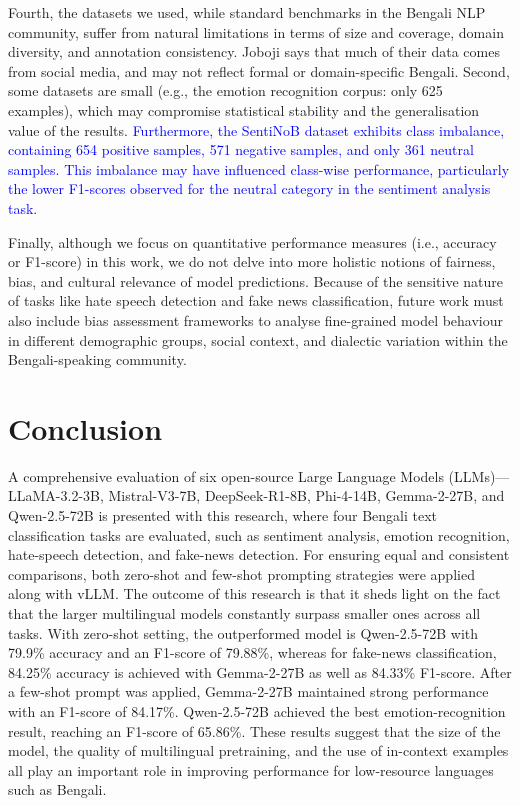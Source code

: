\documentclass[10pt,letterpaper]{article}
\newcommand{\rev}[1]{\textcolor{blue}{#1}}
\begin{document}
Fourth, the datasets we used, while standard benchmarks in the Bengali NLP community, suffer from natural limitations in terms of size and coverage, domain diversity, and annotation consistency. Joboji says that much of their data comes from social media, and may not reflect formal or domain-specific Bengali. Second, some datasets are small (e.g., the emotion recognition corpus: only 625 examples), which may compromise statistical stability and the generalisation value of the results. \rev{Furthermore, the SentiNoB dataset exhibits class imbalance, containing 654 positive samples, 571 negative samples, and only 361 neutral samples. This imbalance may have influenced class-wise performance, particularly the lower F1-scores observed for the neutral category in the sentiment analysis task.}


Finally, although we focus on quantitative performance measures (i.e., accuracy or F1-score) in this work, we do not delve into more holistic notions of fairness, bias, and cultural relevance of model predictions. Because of the sensitive nature of tasks like hate speech detection and fake news classification, future work must also include bias assessment frameworks to analyse fine-grained model behaviour in different demographic groups, social context, and dialectic variation within the Bengali-speaking community.


\section*{Conclusion}
\label{sec:conclusion} 

A comprehensive evaluation of six open-source Large Language Models (LLMs)—LLaMA-3.2-3B, Mistral-V3-7B, DeepSeek-R1-8B, Phi-4-14B, Gemma-2-27B, and Qwen-2.5-72B is presented with this research, where four Bengali text classification tasks are evaluated, such as sentiment analysis, emotion recognition, hate-speech detection, and fake-news detection. For ensuring equal and consistent comparisons, both zero-shot and few-shot prompting strategies were applied along with vLLM. The outcome of this research is that it sheds light on the fact that the larger multilingual models constantly surpass smaller ones across all tasks. With zero-shot setting, the outperformed model is Qwen-2.5-72B with 79.9\% accuracy and an F1-score of 79.88\%, whereas for fake-news classification, 84.25\% accuracy is achieved with Gemma-2-27B as well as 84.33\% F1-score. After a few-shot prompt was applied, Gemma-2-27B maintained strong performance with an F1-score of 84.17\%. Qwen-2.5-72B achieved the best emotion-recognition result, reaching an F1-score of 65.86\%. These results suggest that the size of the model, the quality of multilingual pretraining, and the use of in-context examples all play an important role in improving performance for low-resource languages such as Bengali.
\end{document}
